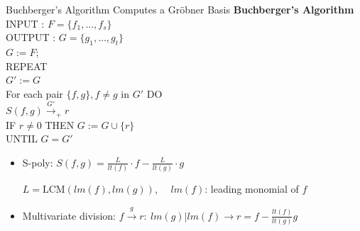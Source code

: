 \documentclass[xcolor=dvipsnames]{beamer}
\newcommand{\bi}{\begin{itemize}}
\newcommand{\ei}{\end{itemize}}
\begin{document}
\begin{frame}{\large{Buchberger's Algorithm Computes a Gr\"obner Basis}}
\vspace{-0.3in}
{\bf Buchberger's Algorithm}\\
 INPUT : $F = \{f_1, \dots, f_s\}$\\
 OUTPUT : $G = \{g_1,\dots ,g_t\}$\\ %
  $G:= F$; \\
  REPEAT\\
  \hspace{0.1in} $G' := G$\\
  \hspace{0.1in} For each pair $\{f, g\}, f \neq g$ in $G'$ DO\\
\hspace{0.2in}  $S(f, g) \stackrel{G'}{\textstyle\longrightarrow}_+
r$ \\
\hspace{0.2in}  IF $r \neq 0$ THEN $G:= G \cup \{r\}$ \\
UNTIL $G = G'$
\bi
\item S-poly: $S(f,g)=\frac{L}{lt(f)}\cdot f - \frac{L}{lt(g)}\cdot g$\par
$L = \text{LCM}(lm(f), lm(g))$, ~~$lm(f)$: leading monomial of $f$
\item Multivariate division: $f\stackrel{g}{\textstyle\longrightarrow}r:~lm(g)|lm(f)\to r = f-\frac{lt(f)}{lt(g)}g$
\ei

\end{frame}
\end{document}
